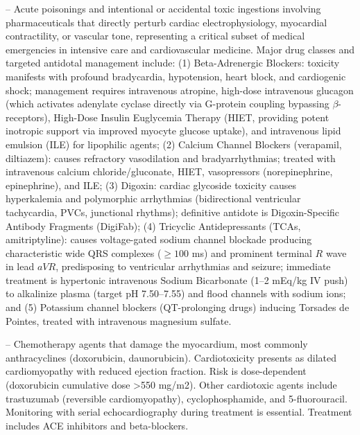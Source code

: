 -- Acute poisonings and intentional or accidental toxic ingestions involving pharmaceuticals that directly perturb cardiac electrophysiology, myocardial contractility, or vascular tone, representing a critical subset of medical emergencies in intensive care and cardiovascular medicine. Major drug classes and targeted antidotal management include: (1) Beta-Adrenergic Blockers: toxicity manifests with profound bradycardia, hypotension, heart block, and cardiogenic shock; management requires intravenous atropine, high-dose intravenous glucagon (which activates adenylate cyclase directly via G-protein coupling bypassing $\beta$-receptors), High-Dose Insulin Euglycemia Therapy (HIET, providing potent inotropic support via improved myocyte glucose uptake), and intravenous lipid emulsion (ILE) for lipophilic agents; (2) Calcium Channel Blockers (verapamil, diltiazem): causes refractory vasodilation and bradyarrhythmias; treated with intravenous calcium chloride/gluconate, HIET, vasopressors (norepinephrine, epinephrine), and ILE; (3) Digoxin: cardiac glycoside toxicity causes hyperkalemia and polymorphic arrhythmias (bidirectional ventricular tachycardia, PVCs, junctional rhythms); definitive antidote is Digoxin-Specific Antibody Fragments (DigiFab); (4) Tricyclic Antidepressants (TCAs, amitriptyline): causes voltage-gated sodium channel blockade producing characteristic wide QRS complexes ($\ge 100$ ms) and prominent terminal $R$ wave in lead $aVR$, predisposing to ventricular arrhythmias and seizure; immediate treatment is hypertonic intravenous Sodium Bicarbonate (1--2 mEq/kg IV push) to alkalinize plasma (target pH 7.50--7.55) and flood channels with sodium ions; and (5) Potassium channel blockers (QT-prolonging drugs) inducing Torsades de Pointes, treated with intravenous magnesium sulfate.

-- Chemotherapy agents that damage the myocardium, most commonly anthracyclines (doxorubicin, daunorubicin). Cardiotoxicity presents as dilated cardiomyopathy with reduced ejection fraction. Risk is dose-dependent (doxorubicin cumulative dose >550 mg/m2). Other cardiotoxic agents include trastuzumab (reversible cardiomyopathy), cyclophosphamide, and 5-fluorouracil. Monitoring with serial echocardiography during treatment is essential. Treatment includes ACE inhibitors and beta-blockers.

